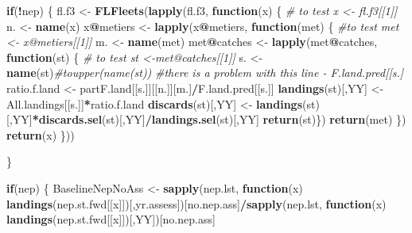 \documentclass[
]{article}
\newenvironment{Shaded}{\begin{snugshade}}{\end{snugshade}}
\newcommand{\CommentTok}[1]{\textcolor[rgb]{0.56,0.35,0.01}{\textit{#1}}}
\newcommand{\ControlFlowTok}[1]{\textcolor[rgb]{0.13,0.29,0.53}{\textbf{#1}}}
\newcommand{\KeywordTok}[1]{\textcolor[rgb]{0.13,0.29,0.53}{\textbf{#1}}}
\newcommand{\NormalTok}[1]{#1}
\newcommand{\OperatorTok}[1]{\textcolor[rgb]{0.81,0.36,0.00}{\textbf{#1}}}
\newcommand{\StringTok}[1]{\textcolor[rgb]{0.31,0.60,0.02}{#1}}
\begin{document}
\begin{Shaded}
\begin{Highlighting}[]
{{{{        \ControlFlowTok{if}\NormalTok{(}\OperatorTok{!}\NormalTok{nep) \{}
\NormalTok{    fl.f3 <-}\StringTok{ }\KeywordTok{FLFleets}\NormalTok{(}\KeywordTok{lapply}\NormalTok{(fl.f3, }\ControlFlowTok{function}\NormalTok{(x) \{}
                          \CommentTok{# to test x <- fl.f3[[1]]}
\NormalTok{                        n. <-}\StringTok{ }\KeywordTok{name}\NormalTok{(x)}
\NormalTok{                        x}\OperatorTok{@}\NormalTok{metiers <-}\StringTok{ }\KeywordTok{lapply}\NormalTok{(x}\OperatorTok{@}\NormalTok{metiers, }\ControlFlowTok{function}\NormalTok{(met) \{}
                                      \CommentTok{#to test met <- x@metiers[[1]]}
\NormalTok{                                      m. <-}\StringTok{ }\KeywordTok{name}\NormalTok{(met)}
\NormalTok{                                      met}\OperatorTok{@}\NormalTok{catches <-}\StringTok{ }\KeywordTok{lapply}\NormalTok{(met}\OperatorTok{@}\NormalTok{catches, }\ControlFlowTok{function}\NormalTok{(st) \{}
                                                      \CommentTok{# to test st <-met@catches[[1]]}
\NormalTok{                                                     s. <-}\StringTok{ }\KeywordTok{name}\NormalTok{(st)}\CommentTok{#toupper(name(st))}
                                                     \CommentTok{#there is a problem with this line -  F.land.pred[[s.]}
\NormalTok{                                                     ratio.f.land <-}\StringTok{ }\NormalTok{partF.land[[s.]][[n.]][m.]}\OperatorTok{/}\NormalTok{F.land.pred[[s.]]}
                                                     \KeywordTok{landings}\NormalTok{(st)[,YY] <-All.landings[[s.]]}\OperatorTok{*}\NormalTok{ratio.f.land}
                                                     \KeywordTok{discards}\NormalTok{(st)[,YY] <-}\StringTok{ }\KeywordTok{landings}\NormalTok{(st)[,YY]}\OperatorTok{*}\KeywordTok{discards.sel}\NormalTok{(st)[,YY]}\OperatorTok{/}\KeywordTok{landings.sel}\NormalTok{(st)[,YY]}
                                                     \KeywordTok{return}\NormalTok{(st)\})}
                                      \KeywordTok{return}\NormalTok{(met) \})}
                        \KeywordTok{return}\NormalTok{(x) \}))}

\NormalTok{        \}}


        \ControlFlowTok{if}\NormalTok{(nep) \{}
\NormalTok{        BaselineNepNoAss <-}\StringTok{ }\KeywordTok{sapply}\NormalTok{(nep.lst, }\ControlFlowTok{function}\NormalTok{(x) }\KeywordTok{landings}\NormalTok{(nep.st.fwd[[x]])[,yr.assess])[no.nep.ass]}\OperatorTok{/}\KeywordTok{sapply}\NormalTok{(nep.lst, }\ControlFlowTok{function}\NormalTok{(x) }\KeywordTok{landings}\NormalTok{(nep.st.fwd[[x]])[,YY])[no.nep.ass]}

}}}}
\end{Highlighting}
\end{Shaded}
\end{document}
